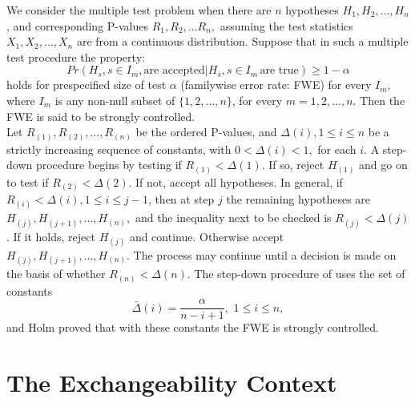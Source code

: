 \documentclass[12pt,fleqn] {article}
\begin{document}
We consider the multiple test problem when there are $n$ hypotheses $H_1, H_2, \ldots, H_n$, and corresponding P-values $ R_1, R_2, \ldots R_n,$ assuming the test statistics $X_1, X_2, \ldots, X_n$ are from a continuous distribution. Suppose that in such a multiple test procedure the property:
\begin{equation} \label{FWE}
Pr(H_s, s \in I_{m},\text{are accepted}| H_s, s \in I_{m} \, \text{are true}) \geq 1- \alpha
\end{equation} holds for prespecified size of test $ \alpha $ (familywise error rate: FWE) for every $I_{m}$, where $I_{m}$ is any non-null subset of $\{1,2, \ldots, n \}$, for every $m = 1,2, \ldots, n.$ Then the FWE is said to be strongly controlled.\\
Let $R_{(1)}, R_{(2)}, \ldots, R_{(n)}$ be the ordered P-values, and $ \Delta(i), 1 \leq i \leq n$ be a strictly increasing sequence of constants, with $0 < \Delta(i)< 1,$ for each $i.$
A step-down procedure begins by testing if $R_{(1)} < \Delta(1).$ If so, reject $H_{(1)}$ and go on to test if  $R_{(2)} < \Delta(2).$ If not, accept all hypotheses. In general, if $R_{(i)} <  \Delta(i), 1 \leq i \leq j-1$, then at step $j$ the remaining hypotheses are $H_{(j)}, H_{(j+1)}, \ldots , H_{(n)},$ and the inequality next to be checked is $R_{(j)}< \Delta(j)$. If it holds, reject $H_{(j)}$ and continue.   Otherwise accept $H_{(j)}, H_{(j+1)}, \ldots , H_{(n)}.$ The process may continue until a decision is made on the basis of whether $R_{(n)}< \Delta(n).$ The step-down procedure of \cite{holmSimpleSequentiallyRejective1979} uses the set of constants
\begin{equation} \label{Holm}
{\bar\Delta}(i) =\frac{\alpha}{n-i+1}, \, \, 1 \leq i \leq n, 
\end{equation} and Holm proved that with these constants the FWE is strongly controlled.

\section{The Exchangeability Context}
\end{document}
